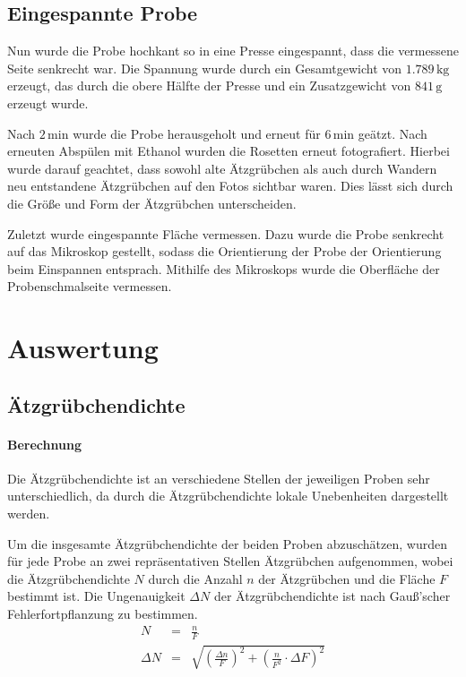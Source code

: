 \documentclass[12pt,a4paper]{scrartcl}
\numberwithin{equation}{section} %
\begin{document}
\hypertarget{eingespannte-probe}{%
\subsection{Eingespannte Probe}\label{eingespannte-probe}}

Nun wurde die Probe hochkant so in eine Presse eingespannt, dass die
vermessene Seite senkrecht war. Die Spannung wurde durch ein
Gesamtgewicht von $1.789\mathrm{\,kg}$ erzeugt, das durch die obere
Hälfte der Presse und ein Zusatzgewicht von $841\mathrm{\,g}$ erzeugt
wurde.

Nach $2\mathrm{\,min}$ wurde die Probe herausgeholt und erneut für
$6\mathrm{\,min}$ geätzt. Nach erneuten Abspülen mit Ethanol wurden
die Rosetten erneut fotografiert. Hierbei wurde darauf geachtet, dass
sowohl alte Ätzgrübchen als auch durch Wandern neu entstandene
Ätzgrübchen auf den Fotos sichtbar waren. Dies lässt sich durch die
Größe und Form der Ätzgrübchen unterscheiden.

Zuletzt wurde eingespannte Fläche vermessen. Dazu wurde die Probe
senkrecht auf das Mikroskop gestellt, sodass die Orientierung der Probe
der Orientierung beim Einspannen entsprach. Mithilfe des Mikroskops
wurde die Oberfläche der Probenschmalseite vermessen.

\hypertarget{auswertung}{%
\section{Auswertung}\label{auswertung}}

\hypertarget{uxe4tzgruxfcbchendichte}{%
\subsection{Ätzgrübchendichte}\label{uxe4tzgruxfcbchendichte}}

\hypertarget{berechnung}{%
\paragraph*{Berechnung}\label{berechnung}}

Die Ätzgrübchendichte ist an verschiedene Stellen der jeweiligen Proben
sehr unterschiedlich, da durch die Ätzgrübchendichte lokale Unebenheiten
dargestellt werden.

Um die insgesamte Ätzgrübchendichte der beiden Proben abzuschätzen,
wurden für jede Probe an zwei repräsentativen Stellen Ätzgrübchen
aufgenommen, wobei die Ätzgrübchendichte $N$ durch die Anzahl $n$
der Ätzgrübchen und die Fläche $F$ bestimmt ist. Die Ungenauigkeit
$\Delta N$ der Ätzgrübchendichte ist nach Gauß'scher
Fehlerfortpflanzung zu bestimmen.
\begin{eqnarray}
    N &=& \frac{n}{F} \label{N}\\
    \Delta N &=& \sqrt{
        \left(\frac{\Delta n}{F}\right)^2
        + \left(\frac{n}{F^2} \cdot \Delta F\right)^2} \label{DeltaN}
\end{eqnarray}
\end{document}

